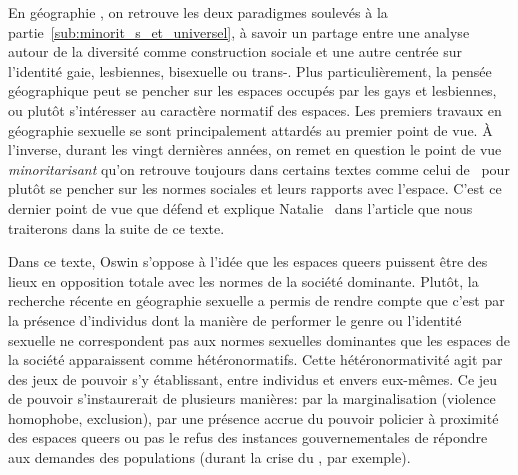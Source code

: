 
En géographie \qu{}, on retrouve les deux paradigmes soulevés à la partie~\ref{sub:minorit_s_et_universel}, à savoir un partage entre une analyse autour de la diversité comme construction sociale et une autre centrée sur l'identité gaie, lesbiennes, bisexuelle ou trans-. 
Plus particulièrement, la pensée géographique peut se pencher sur les espaces occupés par les gays et lesbiennes, ou plutôt s'intéresser au caractère normatif des espaces. 
Les premiers travaux en géographie sexuelle se sont principalement attardés au premier point de vue. 
À l'inverse, durant les vingt dernières années, on remet en question le point de vue \emph{minoritarisant} qu'on retrouve toujours dans certains textes comme celui de~\citet{Sinfield1996} pour plutôt se pencher sur les normes sociales et leurs rapports avec l'espace. 
C'est ce dernier point de vue que défend et explique Natalie~\citet{Oswin2008} dans l'article  que nous traiterons dans la suite de ce texte.

Dans ce texte, Oswin s'oppose à l'idée que les espaces queers puissent être des lieux en opposition totale avec les normes de la société dominante. 
Plutôt, la recherche récente en géographie sexuelle a permis de rendre compte que c'est par la présence d'individus dont la manière de performer le genre ou l'identité sexuelle ne correspondent pas aux normes sexuelles dominantes que les espaces de la société apparaissent comme hétéronormatifs.
Cette hétéronormativité agit par des jeux de pouvoir s'y établissant, entre individus et envers eux-mêmes. 
Ce jeu de pouvoir s'instaurerait de plusieurs manières: par la marginalisation (violence homophobe, exclusion), par une présence accrue du pouvoir policier à proximité des espaces queers ou pas le refus des instances gouvernementales de répondre aux demandes des populations \lgbt{} (durant la crise du \sida, par exemple).

